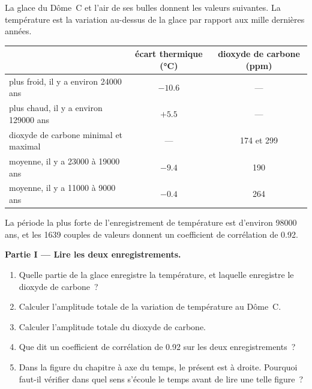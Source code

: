 \begin{problem}
\label{pb:g12:past-climates:1}
La glace du Dôme~C et l'air de ses bulles donnent les valeurs suivantes. La
température est la variation au-dessus de la glace par rapport aux mille
dernières années.

\begin{center}
\small
\begin{tabular}{|l|c|c|}
\hline
 & \textbf{écart thermique (\unit{\degreeCelsius})} & \textbf{dioxyde de carbone (ppm)} \\
\hline
plus froid, il y a environ \num{24000} ans & $-10.6$ & --- \\
plus chaud, il y a environ \num{129000} ans & $+5.5$ & --- \\
dioxyde de carbone minimal et maximal & --- & 174 et 299 \\
moyenne, il y a \num{23000} à \num{19000} ans & $-9.4$ & 190 \\
moyenne, il y a \num{11000} à \num{9000} ans & $-0.4$ & 264 \\
\hline
\end{tabular}
\end{center}

La période la plus forte de l'enregistrement de température est d'environ
\num{98000} ans, et les 1639 couples de valeurs donnent un coefficient de
corrélation de 0.92.

\medskip
\noindent\textbf{Partie I --- Lire les deux enregistrements.}
\begin{enumerate}
  \item Quelle partie de la glace enregistre la température, et laquelle
        enregistre le dioxyde de carbone~?
  \item Calculer l'amplitude totale de la variation de température au
        Dôme~C.
  \item Calculer l'amplitude totale du dioxyde de carbone.
  \item Que dit un coefficient de corrélation de 0.92 sur les deux
        enregistrements~?
  \item Dans la figure du chapitre à axe du temps, le présent est à droite.
        Pourquoi faut-il vérifier dans quel sens s'écoule le temps avant de
        lire une telle figure~?
\end{enumerate}


\end{problem}
